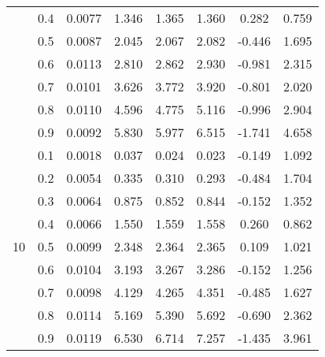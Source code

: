 \documentclass[11pt,a4paper]{report}
\begin{document}
\begin{longtable}{ | c | c || c | c | c | c | c | c | }
 & 0.4 & 0.0077 & 1.346 & 1.365 & 1.360 & 0.282 & 0.759 \\
 & 0.5 & 0.0087 & 2.045 & 2.067 & 2.082 & -0.446 & 1.695 \\
 & 0.6 & 0.0113 & 2.810 & 2.862 & 2.930 & -0.981 & 2.315 \\
 & 0.7 & 0.0101 & 3.626 & 3.772 & 3.920 & -0.801 & 2.020 \\
 & 0.8 & 0.0110 & 4.596 & 4.775 & 5.116 & -0.996 & 2.904 \\
 & 0.9 & 0.0092 & 5.830 & 5.977 & 6.515 & -1.741 & 4.658 \\
 \hline
\multirow{9}{*}{10} & 0.1 & 0.0018 & 0.037 & 0.024 & 0.023 & -0.149 & 1.092 \\
 & 0.2 & 0.0054 & 0.335 & 0.310 & 0.293 & -0.484 & 1.704 \\
 & 0.3 & 0.0064 & 0.875 & 0.852 & 0.844 & -0.152 & 1.352 \\
 & 0.4 & 0.0066 & 1.550 & 1.559 & 1.558 & 0.260 & 0.862 \\
 & 0.5 & 0.0099 & 2.348 & 2.364 & 2.365 & 0.109 & 1.021 \\
 & 0.6 & 0.0104 & 3.193 & 3.267 & 3.286 & -0.152 & 1.256 \\
 & 0.7 & 0.0098 & 4.129 & 4.265 & 4.351 & -0.485 & 1.627 \\
 & 0.8 & 0.0114 & 5.169 & 5.390 & 5.692 & -0.690 & 2.362 \\
 & 0.9 & 0.0119 & 6.530 & 6.714 & 7.257 & -1.435 & 3.961 \\
 \hline
\hline
\end{longtable}
\end{document}
